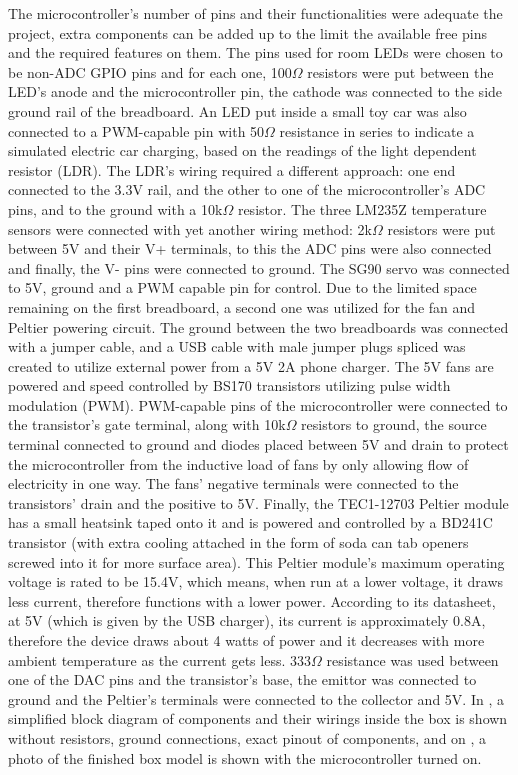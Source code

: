 The microcontroller's number of pins and their functionalities were adequate the project, extra components can be added up to the limit the available free pins and the required features on them. The pins used for room LEDs were chosen to be non-ADC GPIO pins and for each one, 100$\Omega$ resistors were put between the LED's anode and the microcontroller pin, the cathode was connected to the side ground rail of the breadboard. An LED put inside a small toy car was also connected to a PWM-capable pin with 50$\Omega$ resistance in series to indicate a simulated electric car charging, based on the readings of the light dependent resistor (LDR). The LDR's wiring required a different approach: one end connected to the 3.3V rail, and the other to one of the microcontroller's ADC pins, and to the ground with a 10k$\Omega$ resistor. The three LM235Z temperature sensors were connected with yet another wiring method: 2k$\Omega$ resistors were put between 5V and their V+ terminals, to this the ADC pins were also connected and finally, the V- pins were connected to ground. The SG90 servo was connected to 5V, ground and a PWM capable pin for control. Due to the limited space remaining on the first breadboard, a second one was utilized for the fan and Peltier powering circuit. The ground between the two breadboards was connected with a jumper cable, and a USB cable with male jumper plugs spliced was created to utilize external power from a 5V 2A phone charger. The 5V fans are powered and speed controlled by BS170 transistors utilizing pulse width modulation (PWM). PWM-capable pins of the microcontroller were connected to the transistor's gate terminal, along with 10k$\Omega$ resistors to ground, the source terminal connected to ground and diodes placed between 5V and drain to protect the microcontroller from the inductive load of fans by only allowing flow of electricity in one way. The fans' negative terminals were connected to the transistors' drain and the positive to 5V. Finally, the TEC1-12703 Peltier module has a small heatsink taped onto it and is powered and controlled by a BD241C transistor (with extra cooling attached in the form of soda can tab openers screwed into it for more surface area). This Peltier module's maximum operating voltage is rated to be 15.4V, which means, when run at a lower voltage, it draws less current, therefore functions with a lower power. According to its datasheet, at 5V (which is given by the USB charger), its current is approximately 0.8A, therefore the device draws about 4 watts of power and it decreases with more ambient temperature as the current gets less. \cite{PeltierDatasheet} 333$\Omega$ resistance was used between one of the DAC pins and the transistor's base, the emittor was connected to ground and the Peltier's terminals were connected to the collector and 5V. In , a simplified block diagram of components and their wirings inside the box is shown without resistors, ground connections, exact pinout of components, and on , a photo of the finished box model is shown with the microcontroller turned on.

